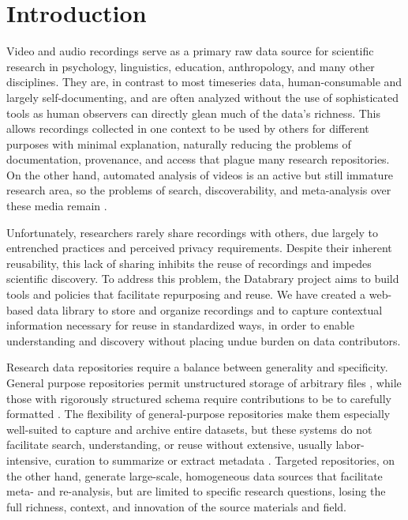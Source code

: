 \documentclass{sig-alternate}
\begin{document}


\section{Introduction}

Video and audio recordings serve as a primary raw data source for scientific research in psychology, linguistics, education, anthropology, and many other disciplines.
They are, in contrast to most timeseries data, human-consumable and largely self-documenting, and are often analyzed without the use of sophisticated tools as human observers can directly glean much of the data's richness.
This allows recordings collected in one context to be used by others for different purposes with minimal explanation, naturally reducing the problems of documentation, provenance, and access that plague many research repositories.
On the other hand, automated analysis of videos is an active but still immature research area, so the problems of search, discoverability, and meta-analysis over these media remain \cite{Albertson_2013, Lanagan_Smeaton_2012}.

Unfortunately, researchers rarely share recordings with others, due largely to entrenched practices and perceived privacy requirements.
Despite their inherent reusability, this lack of sharing inhibits the reuse of recordings and impedes scientific discovery.
To address this problem, the Databrary project aims to build tools and policies that facilitate repurposing and reuse.
We have created a web-based data library to store and organize recordings and to capture contextual information necessary for reuse in standardized ways, in order to enable understanding and discovery without placing undue burden on data contributors.

Research data repositories require a balance between generality and specificity.
General purpose repositories permit unstructured storage of arbitrary files \cite{dataverse, dryad, purr}, while those with rigorously structured schema require contributions to be to carefully formatted \cite{HCP, PGP, talkbank}.
The flexibility of general-purpose repositories make them especially well-suited to capture and archive entire datasets, but these systems do not facilitate search, understanding, or reuse without extensive, usually labor-intensive, curation to summarize or extract metadata \cite{Peer_2012}.
Targeted repositories, on the other hand, generate large-scale, homogeneous data sources that facilitate meta- and re-analysis, but are limited to specific research questions, losing the full richness, context, and innovation of the source materials and field.
\end{document}
